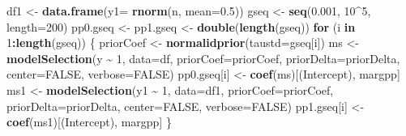 \documentclass[
]{book}
\newenvironment{Shaded}{\begin{snugshade}}{\end{snugshade}}
\newcommand{\AttributeTok}[1]{\textcolor[rgb]{0.13,0.29,0.53}{#1}}
\newcommand{\ConstantTok}[1]{\textcolor[rgb]{0.56,0.35,0.01}{#1}}
\newcommand{\ControlFlowTok}[1]{\textcolor[rgb]{0.13,0.29,0.53}{\textbf{#1}}}
\newcommand{\DecValTok}[1]{\textcolor[rgb]{0.00,0.00,0.81}{#1}}
\newcommand{\FloatTok}[1]{\textcolor[rgb]{0.00,0.00,0.81}{#1}}
\newcommand{\FunctionTok}[1]{\textcolor[rgb]{0.13,0.29,0.53}{\textbf{#1}}}
\newcommand{\NormalTok}[1]{#1}
\newcommand{\OtherTok}[1]{\textcolor[rgb]{0.56,0.35,0.01}{#1}}
\newcommand{\SpecialCharTok}[1]{\textcolor[rgb]{0.81,0.36,0.00}{\textbf{#1}}}
\newcommand{\StringTok}[1]{\textcolor[rgb]{0.31,0.60,0.02}{#1}}
\theoremstyle{definition}
\theoremstyle{definition}
\theoremstyle{definition}
\theoremstyle{definition}
\theoremstyle{remark}
\begin{document}
\begin{Shaded}
\begin{Highlighting}[]
\NormalTok{df1 }\OtherTok{\textless{}{-}} \FunctionTok{data.frame}\NormalTok{(}\AttributeTok{y1=} \FunctionTok{rnorm}\NormalTok{(n, }\AttributeTok{mean=}\FloatTok{0.5}\NormalTok{))}
\NormalTok{gseq }\OtherTok{\textless{}{-}} \FunctionTok{seq}\NormalTok{(}\FloatTok{0.001}\NormalTok{, }\DecValTok{10}\SpecialCharTok{\^{}}\DecValTok{5}\NormalTok{, }\AttributeTok{length=}\DecValTok{200}\NormalTok{)}
\NormalTok{pp0.gseq }\OtherTok{\textless{}{-}}\NormalTok{ pp1.gseq }\OtherTok{\textless{}{-}} \FunctionTok{double}\NormalTok{(}\FunctionTok{length}\NormalTok{(gseq))}
\ControlFlowTok{for}\NormalTok{ (i }\ControlFlowTok{in} \DecValTok{1}\SpecialCharTok{:}\FunctionTok{length}\NormalTok{(gseq)) \{}
\NormalTok{  priorCoef }\OtherTok{\textless{}{-}} \FunctionTok{normalidprior}\NormalTok{(}\AttributeTok{taustd=}\NormalTok{gseq[i])}
\NormalTok{  ms }\OtherTok{\textless{}{-}} \FunctionTok{modelSelection}\NormalTok{(y }\SpecialCharTok{\textasciitilde{}} \DecValTok{1}\NormalTok{, }\AttributeTok{data=}\NormalTok{df, }\AttributeTok{priorCoef=}\NormalTok{priorCoef, }\AttributeTok{priorDelta=}\NormalTok{priorDelta, }\AttributeTok{center=}\ConstantTok{FALSE}\NormalTok{, }\AttributeTok{verbose=}\ConstantTok{FALSE}\NormalTok{)  }
\NormalTok{  pp0.gseq[i] }\OtherTok{\textless{}{-}} \FunctionTok{coef}\NormalTok{(ms)[}\StringTok{\textquotesingle{}(Intercept)\textquotesingle{}}\NormalTok{, }\StringTok{\textquotesingle{}margpp\textquotesingle{}}\NormalTok{]}
\NormalTok{  ms1 }\OtherTok{\textless{}{-}} \FunctionTok{modelSelection}\NormalTok{(y1 }\SpecialCharTok{\textasciitilde{}} \DecValTok{1}\NormalTok{, }\AttributeTok{data=}\NormalTok{df1, }\AttributeTok{priorCoef=}\NormalTok{priorCoef, }\AttributeTok{priorDelta=}\NormalTok{priorDelta, }\AttributeTok{center=}\ConstantTok{FALSE}\NormalTok{, }\AttributeTok{verbose=}\ConstantTok{FALSE}\NormalTok{)  }
\NormalTok{  pp1.gseq[i] }\OtherTok{\textless{}{-}} \FunctionTok{coef}\NormalTok{(ms1)[}\StringTok{\textquotesingle{}(Intercept)\textquotesingle{}}\NormalTok{, }\StringTok{\textquotesingle{}margpp\textquotesingle{}}\NormalTok{]}
\NormalTok{\}}
\end{Highlighting}
\end{Shaded}
\end{document}
